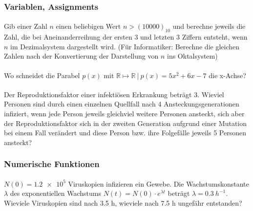 \documentclass[paper=A4, pagesize, DIV=calc, smallheadings,
fontsize=11pt, expansion=false]{scrreprt}
\begin{document}
\subsubsection*{Variablen, Assignments}
\paragraph{}
Gib einer Zahl $n$ einen beliebigen Wert $n > (10000)_{10}$ und berechne jeweils die Zahl, die bei Aneinanderreihung 
der 
ersten 3 und letzten 3 Ziffern entsteht, wenn $n$ im Dezimalsystem dargestellt wird. (Für Informatiker: Berechne die 
gleichen Zahlen nach der Konvertierung der Darstellung von $n$ ins Oktalsystem)
\paragraph{}
Wo schneidet die Parabel $p(x)$  mit $\mathbb{R}\mapsto \mathbb{R}~ |~  p(x)=5x^2 + 6x - 7 $ die x-Achse?
\paragraph{}
Der Reproduktionsfaktor einer infektiösen Erkrankung beträgt 3. Wieviel Personen sind durch einen einzelnen Quellfall 
nach 4 Ansteckungsgenerationen infiziert, wenn jede Person jeweils gleichviel weitere Personen ansteckt, sich aber der 
Reproduktionsfaktor sich in der zweiten Generation aufgrund einer Mutation bei einem Fall verändert und diese Person 
bzw. ihre Folgefälle jeweils 5 Personen ansteckt?

\subsubsection*{Numerische Funktionen}

\paragraph{}
$N(0) = \num{1.2e5}$ Viruskopien infizieren ein Gewebe. Die Wachstumskonstante $\lambda$ des exponentiellen Wachstums
$ N(t) = N(0) \cdot e^{\lambda t}$ beträgt $\lambda = \SI{0.3}{h^{-1}}$. Wieviele Viruskopien sind nach 3.5 h, 
wieviele nach 7.5 h ungefähr entstanden?
\end{document}

